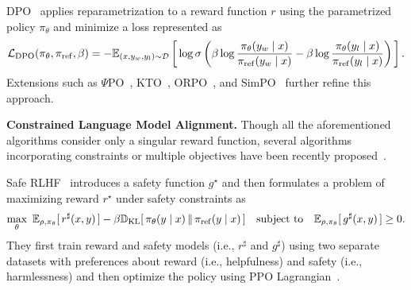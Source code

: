 DPO~\citep{rafailov2023direct} applies reparametrization to a reward function $r$ using the parametrized policy $\pi_\theta$ and minimize a loss represented as 
%
\begin{align}
    \label{eq:loss_dpo}
    \mathcal{L}_\text{DPO}(\pi_{\theta}, \pi_\mathrm{ref}, \beta)
    = - \mathbb{E}_{(x, y_w, y_l) \sim \mathcal{D}} \left[\,\log \sigma \left(\beta \log \frac{\pi_{\theta}(y_w\mid x)}{\pi_\mathrm{ref}(y_w\mid x)} - \beta \log \frac{\pi_{\theta}(y_l\mid x)}{\pi_\mathrm{ref}(y_l\mid x)}\right)\,\right].
\end{align}
Extensions such as $\Psi$PO~\citep{azar2023general}, KTO~\citep{ethayarajh2024kto}, ORPO~\citep{hong2024reference}, and SimPO~\citep{meng2024simpo} further refine this approach.

\textbf{Constrained Language Model Alignment.\space}
%
Though all the aforementioned algorithms consider only a singular reward function, several algorithms incorporating constraints or multiple objectives have been recently proposed~\citep{zhou2023beyond,dai2024safe,zhong2024panacea,liu2024enhancing,wachi2024stepwise,huang2024one}. 

Safe RLHF~\citep{dai2024safe} introduces a safety function $g^\star$ and then formulates a problem of maximizing reward $r^\star$ under safety constraints as
%
\begin{align}
    \max_\theta \ \mathbb{E}_{\rho, \pi_\theta} [\,r^\sharp (x,y)\,] - \beta \mathbb{D}_{\mathrm{KL}}[\,\pi_\theta(y \mid x) \, \| \, \pi_\mathrm{ref}(y \mid x)\,] \quad \text{subject to} \quad \mathbb{E}_{\rho, \pi_\theta} [\,g^\sharp (x,y)\,] \ge 0.
    \label{eq:saferlhf_obj}
\end{align}
%
They first train reward and safety models (i.e., $r^\sharp$ and $g^\sharp$) using two separate datasets with preferences about reward (i.e., helpfulness) and safety (i.e., harmlessness) and then optimize the policy using PPO Lagrangian~\citep{ray2019}.

